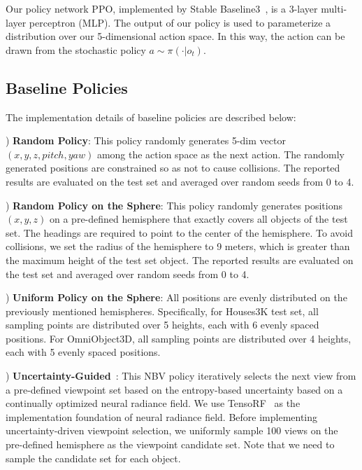 
    Our policy network PPO, implemented by Stable Baseline3~\citep{raffin2021stable}, is a 3-layer multi-layer perceptron (MLP). The output of our policy is used to parameterize a distribution over our 5-dimensional action space. In this way, the action can be drawn from the stochastic policy $a \sim \pi(\cdot |o_t)$.


\subsection{Baseline Policies}
\label{app:baseline}
    The implementation details of baseline policies are described below:

    ) \textbf{Random Policy}: This policy randomly generates 5-dim vector $(x, y, z, pitch, yaw)$ among the action space as the next action. The randomly generated positions are constrained so as not to cause collisions. The reported results are evaluated on the test set and averaged over random seeds from 0 to 4. 

    ) \textbf{Random Policy on the Sphere}: This policy randomly generates positions $(x, y, z)$ on a pre-defined hemisphere that exactly covers all objects of the test set. The headings are required to point to the center of the hemisphere. To avoid collisions, we set the radius of the hemisphere to 9 meters, which is greater than the maximum height of the test set object. The reported results are evaluated on the test set and averaged over random seeds from 0 to 4. 
    
    ) \textbf{Uniform Policy on the Sphere}: All positions are evenly distributed on the previously mentioned hemispheres. Specifically, for Houses3K test set, all sampling points are distributed over 5 heights, each with 6 evenly spaced positions. For OmniObject3D, all sampling points are distributed over 4 heights, each with 5 evenly spaced positions.
    
    ) \textbf{Uncertainty-Guided}~\citep{lee2022uncertainty}: This NBV policy iteratively selects the next view from a pre-defined viewpoint set based on the entropy-based uncertainty based on a continually optimized neural radiance field. We use TensoRF~\citep{chen2022tensorf} as the implementation foundation of neural radiance field. Before implementing uncertainty-driven viewpoint selection, we uniformly sample 100 views on the pre-defined hemisphere as the viewpoint candidate set. Note that we need to sample the candidate set for each object.

